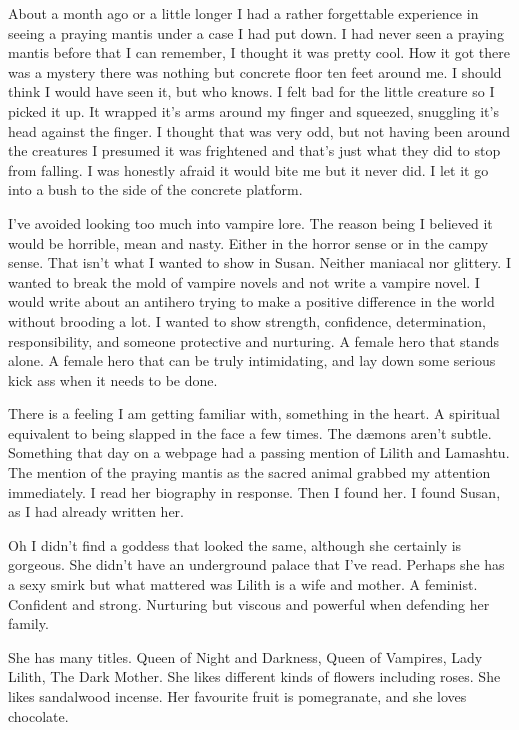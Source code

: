 \documentclass[12pt,twoside,onecolumn,openright,extrafontsizes]{memoir}
\begin{document}
{About a month ago or a little longer I had a rather forgettable experience in seeing a praying mantis under a case I had put down. I had never seen a praying mantis before that I can remember, I thought it was pretty cool. How it got there was a mystery there was nothing but concrete floor ten feet around me. I should think I would have seen it, but who knows. I felt bad for the little creature so I picked it up. It wrapped it's arms around my finger and squeezed, snuggling it's head against the finger. I thought that was very odd, but not having been around the creatures I presumed it was frightened and that's just what they did to stop from falling. I was honestly afraid it would bite me but it never did. I let it go into a bush to the side of the concrete platform.

I've avoided looking too much into vampire lore. The reason being I believed it would be horrible, mean and nasty. Either in the horror sense or in the campy sense. That isn't what I wanted to show in Susan. Neither maniacal nor glittery. I wanted to break the mold of vampire novels and not write a vampire novel. I would write about an antihero trying to make a positive difference in the world without brooding a lot. I wanted to show strength, confidence, determination, responsibility, and someone protective and nurturing. A female hero that stands alone. A female hero that can be truly intimidating, and lay down some serious kick ass when it needs to be done.

There is a feeling I am getting familiar with, something in the heart. A spiritual equivalent to being slapped in the face a few times. The d\ae mons aren't subtle. Something that day on a webpage had a passing mention of Lilith and Lamashtu. The mention of the praying mantis as the sacred animal grabbed my attention immediately. I read her biography in response. Then I found her. I found Susan, as I had already written her.

Oh I didn't find a goddess that looked the same, although she certainly is gorgeous. She didn't have an underground palace that I've read. Perhaps she has a sexy smirk but what mattered was Lilith is a wife and mother. A feminist. Confident and strong. Nurturing but viscous and powerful when defending her family.
	
She has many titles. Queen of Night and Darkness, Queen of Vampires, Lady Lilith, The Dark Mother. She likes different kinds of flowers including roses. She likes sandalwood incense. Her favourite fruit is pomegranate, and she loves chocolate.

}
\end{document}
